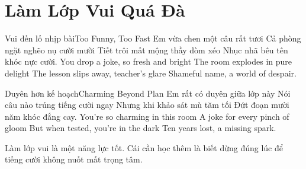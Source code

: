 \chapter{Làm Lớp Vui Quá Đà}

\begin{tutuyetbox}{Vui đến lố nhịp bài}{Too Funny, Too Fast}
Em vừa chen một câu rất tươi
Cả phòng ngặt nghẽo nụ cười mười
Tiết trôi mất mộng thầy dòm xéo
Nhục nhã bêu tên khóc nực cười.
\tcblower
You drop a joke, so fresh and bright 
The room explodes in pure delight 
The lesson slips away, teacher's glare 
Shameful name, a world of despair.
\end{tutuyetbox}

\begin{tutuyetbox}{Duyên hơn kế hoạch}{Charming Beyond Plan}
Em rất có duyên giữa lớp này
Nói câu nào trúng tiếng cười ngay
Nhưng khi khảo sát mù tăm tối
Đứt đoạn mười năm khóc đắng cay.
\tcblower
You're so charming in this room 
A joke for every pinch of gloom 
But when tested, you're in the dark 
Ten years lost, a missing spark.
\end{tutuyetbox}

\begin{ghichu}
Làm lớp vui là một năng lực tốt. Cái cần học thêm là biết dừng đúng lúc để tiếng cười không nuốt mất trọng tâm.
\end{ghichu}